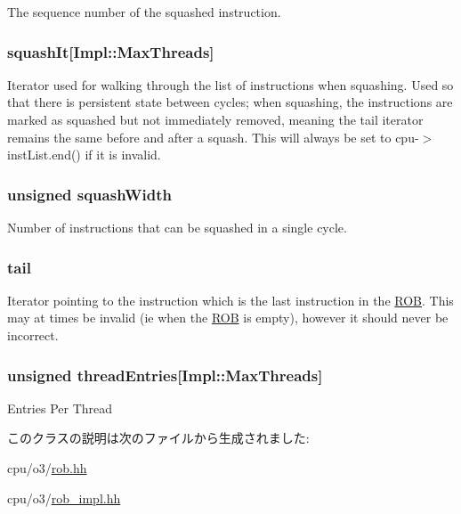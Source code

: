 \label{classROB_a97d5a7e4630ad1d017909f7504b9ec32}
The sequence number of the squashed instruction. \hypertarget{classROB_a51c7e06ec4f16d99b424b2e8ba8ff6fb}{
\subsubsection[{squashIt}]{ {\bf squashIt}\mbox{[}Impl::MaxThreads\mbox{]}}}
\label{classROB_a51c7e06ec4f16d99b424b2e8ba8ff6fb}
Iterator used for walking through the list of instructions when squashing. Used so that there is persistent state between cycles; when squashing, the instructions are marked as squashed but not immediately removed, meaning the tail iterator remains the same before and after a squash. This will always be set to cpu-\/$>$instList.end() if it is invalid. \hypertarget{classROB_a2bfc819c212cc4fda248fe12fbba68b8}{
\subsubsection[{squashWidth}]{\setlength{\rightskip}{0pt plus 5cm}unsigned {\bf squashWidth}}}
\label{classROB_a2bfc819c212cc4fda248fe12fbba68b8}
Number of instructions that can be squashed in a single cycle. \hypertarget{classROB_a20dbd4d473546ec8b674542f765626e5}{
\subsubsection[{tail}]{ {\bf tail}}}
\label{classROB_a20dbd4d473546ec8b674542f765626e5}
Iterator pointing to the instruction which is the last instruction in the \hyperlink{classROB}{ROB}. This may at times be invalid (ie when the \hyperlink{classROB}{ROB} is empty), however it should never be incorrect. \hypertarget{classROB_a22332ec3217f4cc3ca98a489d0b6b6ab}{
\subsubsection[{threadEntries}]{\setlength{\rightskip}{0pt plus 5cm}unsigned {\bf threadEntries}\mbox{[}Impl::MaxThreads\mbox{]}}}
\label{classROB_a22332ec3217f4cc3ca98a489d0b6b6ab}
Entries Per Thread 

このクラスの説明は次のファイルから生成されました:\begin{DoxyCompactItemize}
\item 
cpu/o3/\hyperlink{rob_8hh}{rob.hh}\item 
cpu/o3/\hyperlink{rob__impl_8hh}{rob\_\-impl.hh}\end{DoxyCompactItemize}
